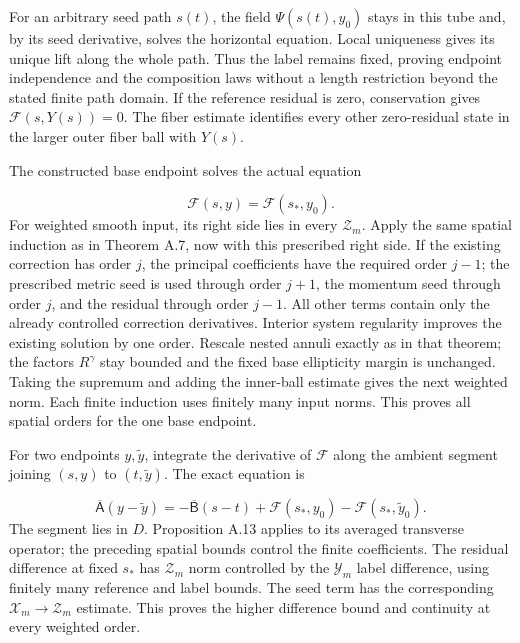 \documentclass[
  english,
  11pt,
  reqno]{amsart}
\begin{document}
For an arbitrary seed path \(s(t)\), the field \(\Psi(s(t),y_0)\) stays
in this tube and, by its seed derivative, solves the horizontal
equation. Local uniqueness gives its unique lift along the whole path.
Thus the label remains fixed, proving endpoint independence and the
composition laws without a length restriction beyond the stated finite
path domain. If the reference residual is zero, conservation gives
\(\mathcal F(s,Y(s))=0\). The fiber estimate identifies every other
zero-residual state in the larger outer fiber ball with \(Y(s)\).

The constructed base endpoint solves the actual equation

\label{eq:online-current-endpoint-elliptic-equation} \[
\mathcal F(s,y)=\mathcal F(s_*,y_0).
\] For weighted smooth input, its right side lies in every
\(\mathcal Z_m\). Apply the same spatial induction as in Theorem A.7,
now with this prescribed right side. If the existing correction has
order \(j\), the principal coefficients have the required order \(j-1\);
the prescribed metric seed is used through order \(j+1\), the momentum
seed through order \(j\), and the residual through order \(j-1\). All
other terms contain only the already controlled correction derivatives.
Interior system regularity improves the existing solution by one order.
Rescale nested annuli exactly as in that theorem; the factors
\(R^\gamma\) stay bounded and the fixed base ellipticity margin is
unchanged. Taking the supremum and adding the inner-ball estimate gives
the next weighted norm. Each finite induction uses finitely many input
norms. This proves all spatial orders for the one base endpoint.

For two endpoints \(y,\widetilde y\), integrate the derivative of
\(\mathcal F\) along the ambient segment joining \((s,y)\) to
\((t,\widetilde y)\). The exact equation is

\label{eq:online-current-exact-endpoint-difference} \[
\overline{\mathsf A}(y-\widetilde y)
=-\overline{\mathsf B}(s-t)
+\mathcal F(s_*,y_0)-\mathcal F(s_*,\widetilde y_0).
\] The segment lies in \(D\). Proposition A.13 applies to its averaged
transverse operator; the preceding spatial bounds control the finite
coefficients. The residual difference at fixed \(s_*\) has
\(\mathcal Z_m\) norm controlled by the \(\mathcal Y_m\) label
difference, using finitely many reference and label bounds. The seed
term has the corresponding \(\mathcal X_m\to\mathcal Z_m\) estimate.
This proves the higher difference bound and continuity at every weighted
order.
\end{document}
